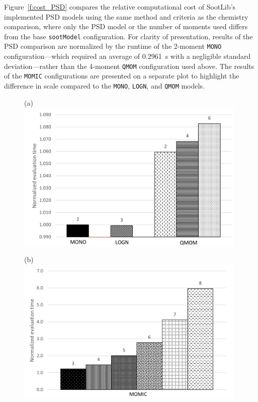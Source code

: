 \documentclass[preprint,letterpaper]{elsarticle}
\begin{document}
Figure~\ref{f:cost_PSD} compares the relative computational cost of SootLib's implemented PSD models using the same method and criteria as the chemistry comparison, where only the PSD model or the number of moments used differs from the base \texttt{sootModel} configuration. For clarity of presentation, results of the PSD comparison are normalized by the runtime of the 2-moment \texttt{MONO} configuration---which required an average of 0.2961~\si{s} with a negligible standard deviation---rather than the 4-moment \texttt{QMOM} configuration used above.
The results of the \texttt{MOMIC} configurations are presented on a separate plot to highlight the difference in scale compared to the \texttt{MONO}, \texttt{LOGN}, and \texttt{QMOM} models.
\begin{figure}
    \begin{minipage}{0.5\textwidth}
        \centering
        (a) \\ \includegraphics[width=0.98\textwidth]{../figures/comp_cost_PSDa}
    \end{minipage}
    \begin{minipage}{0.5\textwidth}
        \centering
        (b) \\ \includegraphics[width=0.98\textwidth]{../figures/comp_cost_PSDb}

\end{minipage}
\end{figure}
\end{document}
